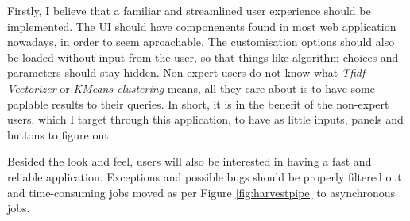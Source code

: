 Firstly, I believe that a familiar and streamlined user experience should be implemented. The UI should have componenents found in most web application nowadays, in order to seem aproachable. The customisation options should also be loaded without input from the user, so that things like algorithm choices and parameters should stay hidden. Non-expert users do not know what \emph{Tfidf Vectorizer} or \emph{KMeans clustering} means, all they care about is to have some paplable results to their queries. In short, it is in the benefit of the non-expert users, which I target through this application, to have as little inputs, panels and buttons to figure out.

Besided the look and feel, users will also be interested in having a fast and reliable application. Exceptions and possible bugs should be properly filtered out and time-consuming jobs moved as per Figure \ref{fig:harvestpipe} to asynchronous jobs.